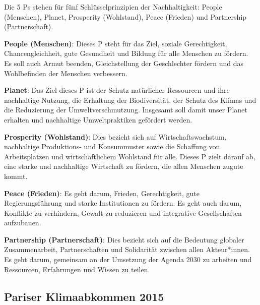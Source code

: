 \documentclass[
  nswissgerman,
  a4paper,
  openany]{book}
\begin{document}
\begin{tcolorbox}[enhanced jigsaw, arc=.35mm, bottomrule=.15mm, bottomtitle=1mm, breakable, colback=white, colbacktitle=quarto-callout-note-color!10!white, colframe=quarto-callout-note-color-frame, coltitle=black, left=2mm, leftrule=.75mm, opacityback=0, opacitybacktitle=0.6, rightrule=.15mm, title={Die 5 Ps der SDGs}, titlerule=0mm, toprule=.15mm, toptitle=1mm]

Die 5 Ps stehen für fünf Schlüsselprinzipien der Nachhaltigkeit: People
(Menschen), Planet, Prosperity (Wohlstand), Peace (Frieden) und
Partnership (Partnerschaft).

\textbf{People (Menschen)}: Dieses P steht für das Ziel, soziale
Gerechtigkeit, Chancengleichheit, gute Gesundheit und Bildung für alle
Menschen zu fördern. Es soll auch Armut beenden, Gleichstellung der
Geschlechter fördern und das Wohlbefinden der Menschen verbessern.

\textbf{Planet}: Das Ziel dieses P ist der Schutz natürlicher Ressourcen
und ihre nachhaltige Nutzung, die Erhaltung der Biodiversität, der
Schutz des Klimas und die Reduzierung der Umweltverschmutzung. Insgesamt
soll damit unser Planet erhalten und nachhaltige Umweltpraktiken
gefördert werden.

\textbf{Prosperity (Wohlstand)}: Dies bezieht sich auf
Wirtschaftswachstum, nachhaltige Produktions- und Konsummuster sowie die
Schaffung von Arbeitsplätzen und wirtschaftlichem Wohlstand für alle.
Dieses P zielt darauf ab, eine starke und nachhaltige Wirtschaft zu
fördern, die allen Menschen zugute kommt.

\textbf{Peace (Frieden)}: Es geht darum, Frieden, Gerechtigkeit, gute
Regierungsführung und starke Institutionen zu fördern. Es geht auch
darum, Konflikte zu verhindern, Gewalt zu reduzieren und integrative
Gesellschaften aufzubauen.

\textbf{Partnership (Partnerschaft)}: Dies bezieht sich auf die
Bedeutung globaler Zusammenarbeit, Partnerschaften und Solidarität
zwischen allen Akteur*innen. Es geht darum, gemeinsam an der Umsetzung
der Agenda 2030 zu arbeiten und Ressourcen, Erfahrungen und Wissen zu
teilen.

\end{tcolorbox}

\subsection{Pariser Klimaabkommen
2015}\label{pariser-klimaabkommen-2015}
\end{document}
